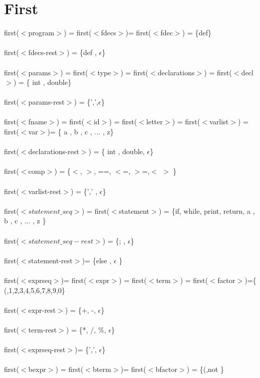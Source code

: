 \documentclass[fleqn]{article}
\begin{document}
\section{First}
first($<$program$>$) = first($<$fdecs$>$)= first($<$fdec$>$) = \{def\}\\
\\
first($<$fdecs-rest$>$) = \{def , $\epsilon$\}\\
\\
first($<$params$>$) = first($<$type$>$) = first($<$declarations$>$) = first($<$decl$>$) = \{ int , double\} \\
\\
first($<$params-rest$>$) = \{',',$\epsilon$\}\\
\\
first($<$fname$>$) = first($<$id$>$) = first($<$letter$>$) = first($<$varlist$>$) = first($<$var$>$)=  \{ a , b , c , ... , z\} \\
\\
first($<$declarations-rest$>$) = \{ int , double, $\epsilon$\}\\ 
\\
first($<$comp$>$) = \{$<$, $>$, ==, $<$=, $>$=,$<$ $>$ \}\\
\\
first($<$varlist-rest$>$) = \{',' , $\epsilon$\} \\ 
\\
first($<statement\_ seq>$) = first($<$statement$>$) = \{if, while, print, return, a , b , c , ... , z \}\\
\\
first($<statement\_ seq-rest>$) = \{; , $\epsilon$\}\\
\\
first($<$statement-rest$>$)= \{else , $\epsilon$ \}\\
\\
first($<$exprseq$>$)= first($<$expr$>$) = first($<$term$>$) = first($<$factor$>$)=\{ (,1,2,3,4,5,6,7,8,9,0\}\\
\\
first($<$expr-rest$>$) = \{+, -,  $\epsilon$\}\\
\\
first($<$term-rest$>$) = \{*, /, $\%$, $\epsilon$\}\\
\\
first($<$exprseq-rest$>$)= \{',', $\epsilon$\}\\
\\
first($<$bexpr$>$) = first($<$bterm$>$)= first($<$bfactor$>$) = \{(,not \}\\
\end{document}
